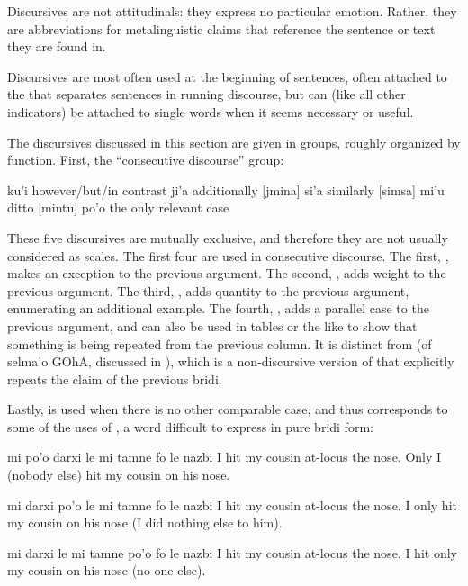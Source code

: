 Discursives are not attitudinals: they express no particular
    emotion. Rather, they are abbreviations for metalinguistic
    claims that reference the sentence or text they are found
    in.

Discursives are most often used at the beginning of
    sentences, often attached to the  that separates
    sentences in running discourse, but can (like all other
    indicators) be attached to single words when it seems necessary
    or useful.

The discursives discussed in this section are given in
    groups, roughly organized by function. First, the ``consecutive
    discourse'' group:

   ku'i    however/but/in contrast     
    ji'a    additionally            [jmina]
    si'a    similarly           [simsa]
    mi'u    ditto               [mintu]
    po'o    the only relevant case

These five discursives are mutually exclusive, and therefore
    they are not usually considered as scales. The first four are
    used in consecutive discourse. The first, , makes an
    exception to the previous argument. The second, , adds
    weight to the previous argument. The third, , adds
    quantity to the previous argument, enumerating an additional
    example. The fourth, , adds a parallel case to the
    previous argument, and can also be used in tables or the like
    to show that something is being repeated from the previous
    column. It is distinct from  (of selma'o GOhA,
    discussed in ), which is a
    non-discursive version of  that explicitly repeats the
    claim of the previous bridi. 

Lastly,  is used when there is no other comparable
    case, and thus corresponds to some of the uses of , a
    word difficult to express in pure bridi form:
\begin{example}
mi po'o darxi le mi tamne fo le nazbi\n
I  hit my cousin at-locus the nose.\n
Only I (nobody else) hit my cousin on his nose.
\end{example}

\begin{example}
mi darxi po'o le mi tamne fo le nazbi\n
I hit  my cousin at-locus the nose.\n
I only hit my cousin on his nose\n
\T	(I did nothing else to him).
\end{example}

\begin{example}
mi darxi le mi tamne po'o fo le nazbi\n
I hit my cousin  at-locus the nose.\n
I hit only my cousin on his nose (no one else).
\end{example}

